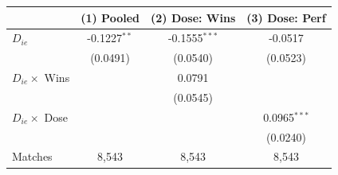 \begin{tabular}{lccc}
\toprule
 & (1) Pooled & (2) Dose: Wins & (3) Dose: Perf \\
\midrule
$D_{ie}$ & -0.1227$^{**}$ & -0.1555$^{***}$ & -0.0517 \\
 & (0.0491) & (0.0540) & (0.0523) \\
$D_{ie} \times$ Wins &  & 0.0791 &  \\
 &  & (0.0545) &  \\
$D_{ie} \times$ Dose &  &  & 0.0965$^{***}$ \\
 &  &  & (0.0240) \\
\midrule
Matches & 8,543 & 8,543 & 8,543 \\
\bottomrule
\end{tabular}

